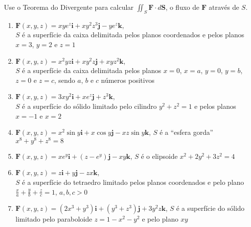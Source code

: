 \documentclass[a4paper, 12pt]{article}
\begin{document}
	
	
	\vspace{5mm}
	
	Use o Teorema do Divergente para calcular $\displaystyle \iint_S \textbf{F} \cdot d\textbf{S}$, o fluxo de $\textbf{F}$ através de $S$.
	
	\begin{enumerate}
		
		\item $\textbf{F}(x,y,z) = xye^z\textbf{i} + xy^{2}z^{3}\textbf{j} - ye^z\textbf{k}$, \\ $S$ é a superfície da caixa delimitada pelos planos coordenados e pelos planos $x = 3$, $y = 2$ e $z = 1$

		\item $\textbf{F}(x,y,z) = x^{2}yz\textbf{i} + xy^{2}z\textbf{j} + xyz^{2}\textbf{k}$, \\ $S$ é a superfície da caixa delimitada pelos planos $x = 0$, $x = a$, $y = 0$, $y = b$, $z = 0$ e $z = c$, sendo $a$, $b$ e $c$ números positivos

		\item $\textbf{F}(x,y,z) = 3xy^2\textbf{i} + xe^z\textbf{j} + z^3\textbf{k}$, \\ $S$ é a superfície do sólido limitado pelo cilindro $y^2 + z^2 = 1$ e pelos planos $x = -1$ e $x = 2$

		\item $\textbf{F}(x,y,z) = x^{2}\sin y\textbf{i} + x\cos y\textbf{j} - xz\sin y\textbf{k}$, \; $S$ é a ``esfera gorda'' $x^8 + y^8 + z^8 = 8$\\

		\item $\textbf{F}(x,y,z) = xe^y\textbf{i} + (z - e^y)\textbf{j} - xy\textbf{k}$, \; $S$ é o elipsoide $x^2 + 2y^2 + 3z^2 = 4$

		\item $\textbf{F}(x,y,z) = z\textbf{i} + y\textbf{j} - zx\textbf{k}$, \\ $S$ é a superfície do tetraedro limitado pelos planos coordenados e pelo plano $\displaystyle \frac{x}{a} + \frac{y}{b} + \frac{z}{c} = 1$, \; $a,b,c > 0$

		\item $\textbf{F}(x,y,z) = (2x^3 + y^3)\textbf{i} + (y^3 + z^3)\textbf{j} + 3y^{2}z\textbf{k}$, \; $S$ é a superfície do sólido limitado pelo paraboloide $z = 1 - x^2 - y^2$ e pelo plano $xy$
		\resposta{$\pi$}


\end{enumerate}
\end{document}
